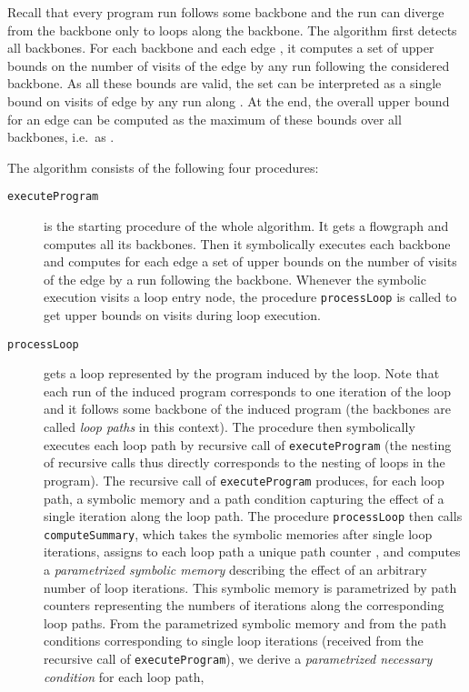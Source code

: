 \documentclass[10pt,a4paper]{article}
\begin{document}
Recall that every program run follows some backbone and the run can diverge
from the backbone only to loops along the backbone. The algorithm first
detects all backbones. For each backbone  and each edge , it
computes a set of upper bounds  on the number of visits of the
edge by any run following the considered backbone. As all these bounds are
valid, the set  can be interpreted as a single bound
 on visits of edge  by any run along . At the
end, the overall upper bound for an edge  can be computed as the maximum of
these bounds over all backbones, i.e.~as
.
 
The algorithm consists of the following four procedures:
\begin{description}
\item[\texttt{executeProgram}] is the starting procedure of the whole
  algorithm. It gets a flowgraph and computes all its backbones. Then it
  symbolically executes each backbone and computes for each edge a set of
  upper bounds on the number of visits of the edge by a run following the
  backbone. Whenever the symbolic execution visits a loop entry node, the
  procedure \texttt{processLoop} is called to get upper bounds on visits
  during loop execution.
\item[\texttt{processLoop}] gets a loop represented by the program induced
  by the loop. Note that each run of the induced program corresponds to one
  iteration of the loop and it follows some backbone of the induced program
  (the backbones are called \emph{loop paths} in this context). The
  procedure then symbolically executes each loop path by recursive call of
  \texttt{executeProgram} (the nesting of recursive calls thus directly
  corresponds to the nesting of loops in the program). The recursive call of
  \texttt{executeProgram} produces, for each loop path, a symbolic memory
  and a path condition capturing the effect of a single iteration along the
  loop path. The procedure \texttt{processLoop} then calls
  \texttt{computeSummary}, which takes the symbolic memories after single
  loop iterations, assigns to each loop path a unique path counter
  , and computes a \emph{parametrized symbolic memory}
   describing the effect of an arbitrary number of
  loop iterations. This symbolic memory is parametrized by path counters
   representing the numbers of
  iterations along the corresponding loop paths. From the parametrized
  symbolic memory and from the path conditions corresponding to single loop
  iterations (received from the recursive call of \texttt{executeProgram}),
  we derive a \emph{parametrized necessary condition} for each loop path,

\end{description}
\end{document}
